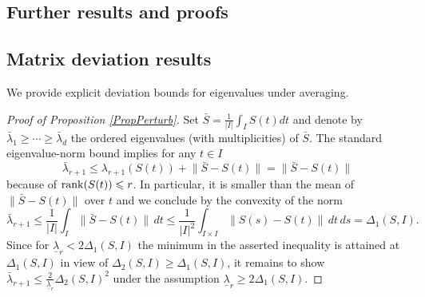 \documentclass[preprint,aos]{imsart}
\numberwithin{equation}{section}
\theoremstyle{remark}
\providecommand{\abs}[1]{\lvert #1 \rvert}
\providecommand{\norm}[1]{\lVert #1 \rVert}
\renewcommand{\le}{\leqslant}
\renewcommand{\ge}{\geqslant}
\begin{document}
\begin{appendix}

\section{Further results and proofs}


\subsection{Matrix deviation results}\label{secMatrixConc}

We provide explicit deviation bounds for eigenvalues under averaging.

\begin{proof}[Proof of Proposition \ref{PropPerturb}]
Set $\bar S=\frac1{\abs{I}}\int_I S(t)dt$ and denote by $\bar\lambda_1\ge\cdots\ge\bar\lambda_d$  the ordered eigenvalues (with multiplicities) of $\bar S$. The standard eigenvalue-norm bound implies for any $t\in I$
\[ \bar\lambda_{r+1}\le \lambda_{r+1}(S(t))+\norm{\bar S-S(t)}=\norm{\bar S-S(t)}
\]
because of $\rank(S(t))\le r$. In particular, it is smaller than the mean of $\norm{\bar S-S(t)}$ over $t$ and we conclude by the convexity of the norm
\[  \bar\lambda_{r+1}\le \frac1{\abs{I}} \int_I \norm{\bar S-S(t)}\,dt\le \frac1{\abs{I}^2}\int_{I\times I} \norm{S(s)-S(t)}\,dt\,ds=\Delta_1(S,I).
\]
Since for $\underline\lambda_r<2 \Delta_1(S,I)$ the minimum in the asserted inequality is attained at $\Delta_1(S,I)$ in view of $\Delta_2(S,I)\ge \Delta_1(S,I)$, it remains to show $\bar\lambda_{r+1} \le \tfrac{2}{\underline\lambda_r}\Delta_2(S,I)^2$ under the assumption $\underline\lambda_r\ge 2\Delta_1(S,I)$.


\end{proof}
\end{appendix}
\end{document}
